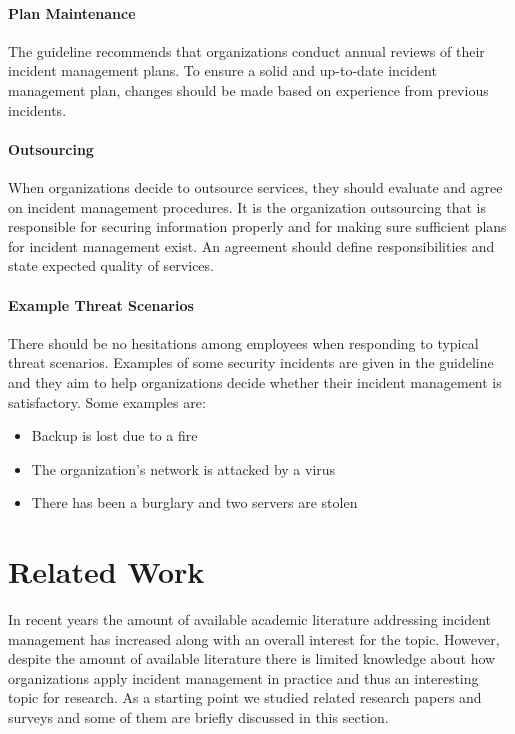 \paragraph{Plan Maintenance}
The guideline recommends that organizations conduct annual reviews of their incident management plans. To ensure a solid and up-to-date incident management plan, changes should be made based on experience from previous incidents. 

\paragraph{Outsourcing}
When organizations decide to outsource services, they should evaluate and agree on incident management procedures. It is the organization outsourcing that is responsible for securing information properly and for making sure sufficient plans for incident management exist. An agreement should define responsibilities and state expected quality of services. 

\paragraph{Example Threat Scenarios}
There should be no hesitations among employees when responding to typical threat scenarios. Examples of some security incidents are given in the guideline and they aim to help organizations decide whether their incident management is satisfactory. Some examples are:

\begin{itemize}
\item Backup is lost due to a fire
\item The organization's network is attacked by a virus
\item There has been a burglary and two servers are stolen 
\end{itemize}



\section{Related Work}
\label{relatedwork}
In recent years the amount of available academic literature addressing incident management has increased along with an overall interest for the topic. However, despite the amount of available literature there is limited knowledge about how organizations apply incident management in practice and thus an interesting topic for research. As a starting point we studied related research papers and surveys and some of them are briefly discussed in this section.

